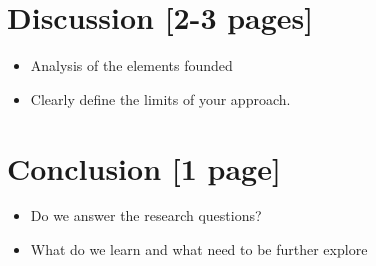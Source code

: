 \documentclass[preprint, 3p,
authoryear]{elsarticle} %
\providecommand{\tightlist}{%
  \setlength{\itemsep}{0pt}\setlength{\parskip}{0pt}}
\begin{document}
\hypertarget{discussion-2-3-pages}{%
\section{Discussion {[}2-3 pages{]}}\label{discussion-2-3-pages}}

\begin{itemize}
\item
  Analysis of the elements founded
\item
  Clearly define the limits of your approach.
\end{itemize}

\hypertarget{conclusion-1-page}{%
\section{Conclusion {[}1 page{]}}\label{conclusion-1-page}}

\begin{itemize}
\tightlist
\item
  Do we answer the research questions?
\item
  What do we learn and what need to be further explore
\end{itemize}

\renewcommand\refname{References}

\end{document}
